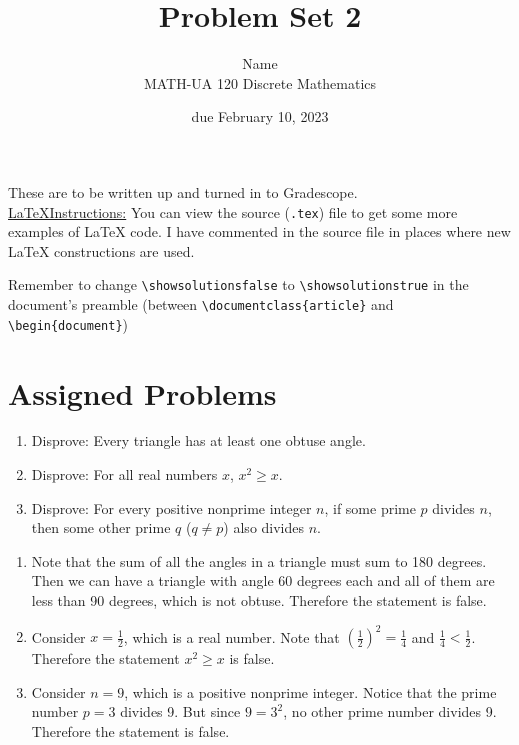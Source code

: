 \documentclass{article}
\title{Problem Set 2}
\author{%
    Name
\\  MATH-UA 120 Discrete Mathematics
}
\date{due February 10, 2023}
\newif\ifshowsolutions
\newcommand{\danger}{\marginpar[\hfill\dbend]{\dbend\hfill}}
\theoremstyle{definition}
\begin{document}
\maketitle



These are to be written up and turned in to Gradescope.\\



\ifshowsolutions
    \SetupExSheets{solution/print=true}
\else
    \danger
 \underline{ \LaTeX  Instructions:}  You can view the source (\texttt{.tex}) file to get some more examples of \LaTeX{} code.  I have commented in the source file in places where new \LaTeX{} constructions are used.
  
  Remember to change \verb|\showsolutionsfalse| to \verb|\showsolutionstrue|
    in the document's preamble 
    (between \verb|\documentclass{article}| and \verb|\begin{document}|)
\fi

\section*{Assigned Problems}


\begin{question}
    \begin{enumerate}
        \item Disprove: Every triangle has at least one obtuse angle.
        \item Disprove: For all real numbers $x$, $x^2\geq x$.
        \item Disprove: For every positive nonprime integer $n$, if some prime $p$ divides $n$, 
            then some other prime $q$ ($q\neq p$) also divides $n$.
    \end{enumerate}
\end{question}
\begin{solution}
\begin{enumerate}
\item Note that the sum of all the angles in a triangle must sum to 180 degrees. Then we can have a triangle with angle 60 degrees each and all of them are less than 90 degrees, which is not obtuse. Therefore the statement is false.

\item Consider $x=\frac{1}{2}$, which is a real number. Note that $\left(\frac{1}{2}\right)^2=\frac{1}{4}$ and $\frac{1}{4}< \frac{1}{2}$. Therefore the statement $x^2\geq x$ is false.

\item Consider $n=9$, which is a positive nonprime integer. Notice that the prime number $p=3$ divides 9. But since $9=3^2$, no other prime number divides 9. Therefore the statement is false.
\end{enumerate}
\end{solution}
\end{document}

